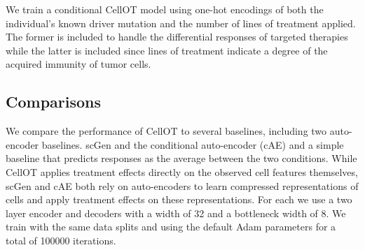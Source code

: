 We train a conditional CellOT model using one-hot encodings of both the individual’s known driver mutation and the number of lines of treatment applied. The former is included to handle the differential responses of targeted therapies while the latter is included since lines of treatment indicate a degree of the acquired immunity of tumor cells.

\subsection{Comparisons}
We compare the performance of CellOT to several baselines, including two auto-encoder baselines. scGen \cite{lotfollahi2019} and the conditional auto-encoder (cAE) \cite{lopez2018} and a simple baseline that predicts responses as the average between the two conditions. While CellOT applies treatment effects directly on the observed cell features themselves, scGen and cAE both rely on auto-encoders to learn compressed representations of cells and apply treatment effects on these representations. For each we use a two layer encoder and decoders with a width of 32 and a bottleneck width of 8. We train with the same data splits and using the default Adam parameters for a total of 100000 iterations.
